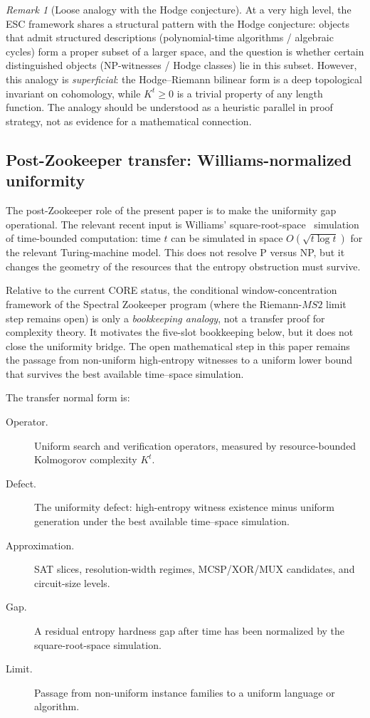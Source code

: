 \documentclass[aps,prd,twocolumn,superscriptaddress,nofootinbib]{revtex4-2}
\theoremstyle{definition}
\theoremstyle{remark}
\newtheorem{remark}[theorem]{Remark}
\begin{document}
\begin{remark}[Loose analogy with the Hodge conjecture]
\label{rem:hodge-analogy}
At a very high level, the ESC framework shares a structural pattern with the Hodge conjecture: objects that admit structured descriptions (polynomial-time algorithms / algebraic cycles) form a proper subset of a larger space, and the question is whether certain distinguished objects (NP-witnesses / Hodge classes) lie in this subset. However, this analogy is \emph{superficial}: the Hodge--Riemann bilinear form is a deep topological invariant on cohomology, while $K^t \geq 0$ is a trivial property of any length function. The analogy should be understood as a heuristic parallel in proof strategy, not as evidence for a mathematical connection.
\end{remark}


\subsection{Post-Zookeeper transfer: Williams-normalized uniformity}
\label{subsec:zookeeper-pnp-transfer}

The post-Zookeeper role of the present paper is to make the uniformity
gap operational.  The relevant recent input is Williams' square-root-space~\cite{Williams2025}
simulation of time-bounded computation: time $t$ can be simulated in
space $O(\sqrt{t\log t})$ for the relevant Turing-machine model.  This
does not resolve P versus NP, but it changes the geometry of the
resources that the entropy obstruction must survive.

Relative to the current CORE status, the conditional window-concentration
framework of the Spectral Zookeeper program (where the Riemann-$MS2$ limit step
remains open) is only a \emph{bookkeeping analogy}, not a transfer proof
for complexity theory.  It motivates the five-slot bookkeeping below, but
it does not close the uniformity bridge.  The open mathematical step in
this paper remains the passage from non-uniform high-entropy witnesses to
a uniform lower bound that survives the best available time--space
simulation.

The transfer normal form is:
\begin{description}
  \item[Operator.] Uniform search and verification operators, measured by
  resource-bounded Kolmogorov complexity $K^t$.
  \item[Defect.] The uniformity defect: high-entropy witness existence
  minus uniform generation under the best available time--space
  simulation.
  \item[Approximation.] SAT slices, resolution-width regimes, MCSP/XOR/MUX
  candidates, and circuit-size levels.
  \item[Gap.] A residual entropy hardness gap after time has been
  normalized by the square-root-space simulation.
  \item[Limit.] Passage from non-uniform instance families to a uniform
  language or algorithm.
\end{description}
\end{document}
